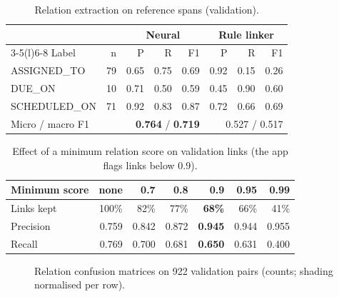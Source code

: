 \begin{table}[htbp]
\centering
\caption{Relation extraction on reference spans (validation).}
\label{tab:relation}
\footnotesize
\begin{tabular}{@{}lrrrrrrr@{}}
\toprule
 & & \multicolumn{3}{c}{Neural} & \multicolumn{3}{c}{Rule linker} \\
\cmidrule(lr){3-5}\cmidrule(l){6-8}
Label & n & P & R & F1 & P & R & F1 \\
\midrule
ASSIGNED\_TO & 79 & 0.65 & 0.75 & 0.69 & 0.92 & 0.15 & 0.26 \\
DUE\_ON & 10 & 0.71 & 0.50 & 0.59 & 0.45 & 0.90 & 0.60 \\
SCHEDULED\_ON & 71 & 0.92 & 0.83 & 0.87 & 0.72 & 0.66 & 0.69 \\
\midrule
Micro / macro F1 & & \multicolumn{3}{r}{\textbf{0.764} / \textbf{0.719}} & \multicolumn{3}{r}{0.527 / 0.517} \\
\bottomrule
\end{tabular}
\end{table}


\begin{table}[htbp]
\centering
\caption{Effect of a minimum relation score on validation links (the app flags links below 0.9).}
\label{tab:threshold}
\footnotesize
\begin{tabular}{@{}lrrrrrr@{}}
\toprule
Minimum score & none & 0.7 & 0.8 & \textbf{0.9} & 0.95 & 0.99 \\
\midrule
Links kept & 100\% & 82\% & 77\% & \textbf{68\%} & 66\% & 41\% \\
Precision & 0.759 & 0.842 & 0.872 & \textbf{0.945} & 0.944 & 0.955 \\
Recall & 0.769 & 0.700 & 0.681 & \textbf{0.650} & 0.631 & 0.400 \\
\bottomrule
\end{tabular}
\end{table}

\begin{figure}[htbp]
\centering
{}
\caption{Relation confusion matrices on 922 validation pairs (counts; shading normalised per row).}
\label{fig:relconf}
\end{figure}

